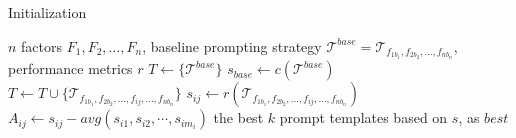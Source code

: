 % 

\begin{algorithm*}[h]
\caption{Initialization}
\label{algorithm:initiation}
\begin{algorithmic}[1]
\small
\Require $ n $ factors $ F_1, F_2, \ldots, F_n $, baseline prompting strategy $ \mathcal{T}^{base} = \mathcal{T}_{f_{1b_{1}}, f_{2b_{2}}, \ldots, {f_{nb_{n}}}} $, performance metrics $r$
\State $T \gets \{\mathcal{T}^{base}\} $
\State $s_{base} \gets c(\mathcal{T}^{base}) $
\State $T \gets T \cup \{\mathcal{T}_{f_{1b_{1}}, f_{2b_{2}}, \ldots, f_{ij}, \ldots, {f_{nb_{n}}}}\} $
\State $s_{ij} \gets r(\mathcal{T}_{f_{1b_{1}}, f_{2b_{2}}, \ldots, f_{ij}, \ldots, {f_{nb_{n}}}}) $
\EndFor
{}
\State $A_{ij} \gets s_{ij} - avg(s_{i1}, s_{i2}, \cdots, s_{i{m_i}}) $
\EndFor
\EndFor
\State \Return the best $k$ prompt templates based on $s$,
as $best$
\end{algorithmic}
\end{algorithm*}

